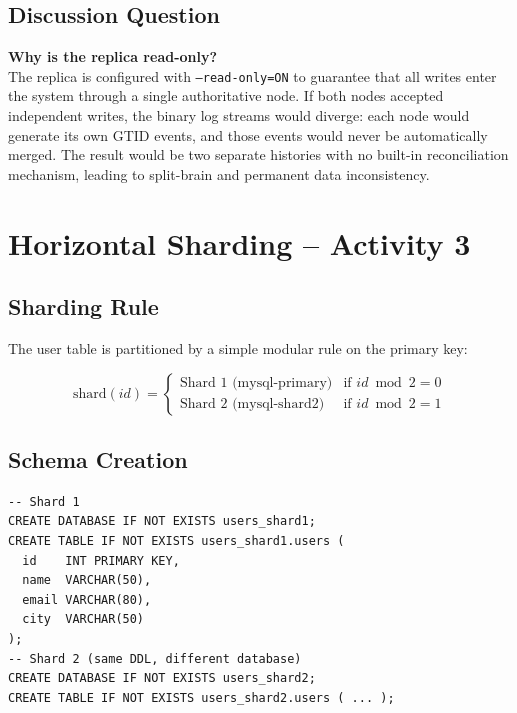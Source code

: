 \documentclass[12pt,a4paper]{article}
\begin{document}
\subsection{Discussion Question}

\textbf{Why is the replica read-only?} \\[0.3em]
The replica is configured with \texttt{--read-only=ON} to guarantee that all
writes enter the system through a single authoritative node.  If both nodes
accepted independent writes, the binary log streams would diverge: each node
would generate its own GTID events, and those events would never be
automatically merged.  The result would be two separate histories with no
built-in reconciliation mechanism, leading to split-brain and permanent data
inconsistency.

\section{Horizontal Sharding -- Activity 3}

\subsection{Sharding Rule}

The user table is partitioned by a simple modular rule on the primary key:

\[
  \text{shard}(id) =
  \begin{cases}
    \text{Shard 1 (mysql-primary)} & \text{if } id \bmod 2 = 0 \\
    \text{Shard 2 (mysql-shard2)}  & \text{if } id \bmod 2 = 1
  \end{cases}
\]

\subsection{Schema Creation}

\begin{lstlisting}[style=sqlstyle, caption={Schema on both shards (identical structure).}]
-- Shard 1
CREATE DATABASE IF NOT EXISTS users_shard1;
CREATE TABLE IF NOT EXISTS users_shard1.users (
  id    INT PRIMARY KEY,
  name  VARCHAR(50),
  email VARCHAR(80),
  city  VARCHAR(50)
);
-- Shard 2 (same DDL, different database)
CREATE DATABASE IF NOT EXISTS users_shard2;
CREATE TABLE IF NOT EXISTS users_shard2.users ( ... );
\end{lstlisting}
\end{document}
